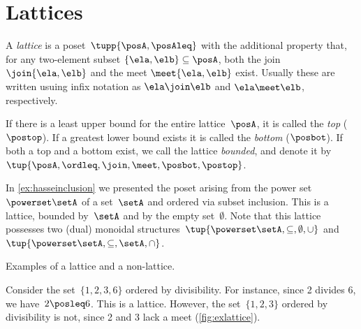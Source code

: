

\section{Lattices}



\begin{definition}[Lattice]
  \label{def:lattice}
  A \emph{lattice} is a poset~$\tupp{\posA,\posAleq}$ with the additional property that, for any two-element subset $\{\ela, \elb \} \subseteq \posA$, both the join $\join \{\ela, \elb \}$ and the meet $\meet \{\ela, \elb \}$ exist. Usually these are written usuing infix notation as $\ela \join \elb$ and $\ela \meet \elb$, respectively. 
  
 

\begin{remark}\label{rem:bounded-lattices}
  \label{def:top}
  \label{def:bot}
  If there is a least upper bound for the entire lattice~$\posA$, it is called
  the \emph{top} ($\postop$). If a greatest lower bound exists it is called the \emph{bottom} ($\posbot$). If both a top and a bottom exist, we call the lattice \emph{bounded}, and denote it by~$\tup{\posA,\ordleq,\join,\meet,\posbot,\postop}$.
\end{remark}

\begin{example}
  In \cref{ex:hasseinclusion} we presented the poset arising from the power set~$\powerset \setA$ of a set~$\setA$ and ordered via subset inclusion. This is a lattice, bounded by~$\setA$ and by the empty set~$\emptyset$. Note that this lattice possesses two (dual) monoidal structures~$\tup{\powerset \setA,\subseteq,\emptyset,\cup}$ and~$\tup{\powerset \setA,\subseteq,\setA,\cap}$.
\end{example}
\begin{marginfigure}


\caption{Examples of a lattice and a non-lattice. }
\label{fig:exlattice}
\end{marginfigure}

\begin{example}
  Consider the set~$\{1,2,3,6\}$ ordered by divisibility. For instance, since 2 divides 6, we have~$2\posleq 6$.
  This is a lattice. However, the set~$\{1,2,3\}$ ordered by divisibility is not, since 2 and 3 lack a meet (\cref{fig:exlattice}).
\end{example}



\end{definition}
